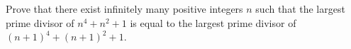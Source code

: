 Prove that there exist infinitely many positive integers $n$ such that the largest prime divisor of $n^4 + n^2 + 1$ is equal to the largest prime divisor of $(n+1)^4 + (n+1)^2 + 1$.

